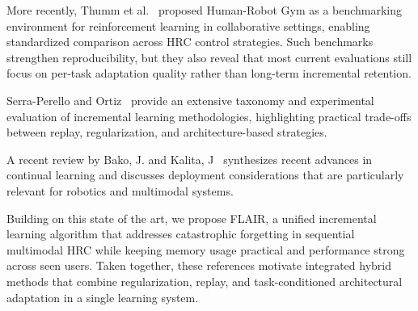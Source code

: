 \documentclass[3p,times,procedia]{elsarticle}
\begin{document}
More recently, Thumm et al.~\cite{thumm2024hrgym} proposed Human-Robot Gym as a benchmarking environment for reinforcement learning in collaborative settings, enabling standardized comparison across HRC control strategies. Such benchmarks strengthen reproducibility, but they also reveal that most current evaluations still focus on per-task adaptation quality rather than long-term incremental retention.


Serra-Perello and Ortiz~\cite{serra2025incremental} provide an extensive taxonomy and experimental evaluation of incremental learning methodologies, highlighting practical trade-offs between replay, regularization, and architecture-based strategies. 

A recent review by Bako, J. and Kalita, J~\cite{springer2026review} synthesizes recent advances in continual learning and discusses deployment considerations that are particularly relevant for robotics and multimodal systems.

Building on this state of the art, we propose FLAIR, a unified incremental learning algorithm that addresses catastrophic forgetting in sequential multimodal HRC while keeping memory usage practical and performance strong across seen users. Taken together, these references motivate integrated hybrid methods that combine regularization, replay, and task-conditioned architectural adaptation in a single learning system.

\end{document}
